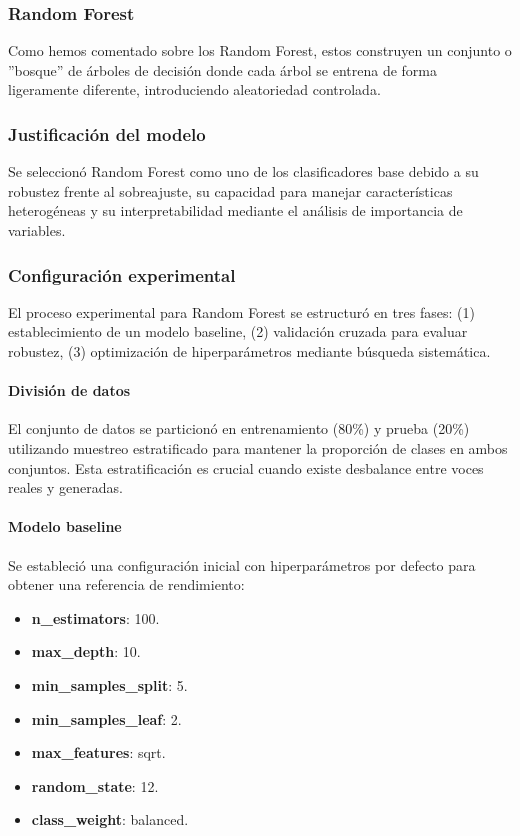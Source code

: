 \subsubsection{Random Forest}

Como hemos comentado sobre los Random Forest, estos construyen un conjunto o ''bosque'' de árboles de decisión donde cada árbol se entrena de forma ligeramente diferente, introduciendo aleatoriedad controlada.

\subsubsection*{Justificación del modelo}

Se seleccionó Random Forest como uno de los clasificadores base debido a su robustez frente al sobreajuste, su capacidad para manejar características heterogéneas y su interpretabilidad mediante el análisis de importancia de variables.

\subsubsection*{Configuración experimental}

El proceso experimental para Random Forest se estructuró en tres fases: (1) establecimiento de un modelo baseline, (2) validación cruzada para evaluar robustez, (3) optimización de hiperparámetros mediante búsqueda sistemática.

\paragraph{División de datos}
El conjunto de datos se particionó en entrenamiento (80\%) y prueba (20\%) utilizando muestreo estratificado para mantener la proporción de clases en ambos conjuntos. Esta estratificación es crucial cuando existe desbalance entre voces reales y generadas.

\paragraph{Modelo baseline}
Se estableció una configuración inicial con hiperparámetros por defecto para obtener una referencia de rendimiento:

\begin{itemize}
	\item \textbf{n\_estimators}: 100.
	\item \textbf{max\_depth}: 10.
	\item \textbf{min\_samples\_split}: 5.
	\item \textbf{min\_samples\_leaf}: 2.
	\item \textbf{max\_features}: sqrt.
	\item \textbf{random\_state}: 12.
	\item \textbf{class\_weight}: balanced.
\end{itemize}

